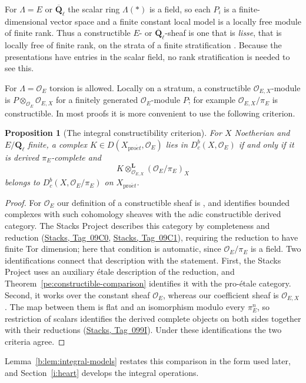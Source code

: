 \documentclass[11pt,a4paper]{article}
\numberwithin{equation}{section}
\newtheorem{proposition}[theorem]{Proposition}
\theoremstyle{definition}
\theoremstyle{remark}
\newcommand{\Dbc}{D^b_c}
\newcommand{\Qbar}{\overline{\mathbf Q}_\ell}
\newcommand{\Ql}{\mathbf Q_\ell}
\newcommand{\proet}{\mathrm{pro}\acute{e}t}
\newcommand{\stacks}[1]{\href{https://stacks.math.columbia.edu/tag/#1}{\textnormal{Stacks, Tag~#1}}}
\begin{document}
For $\Lambda=E$ or $\Qbar$ the scalar ring $\Lambda(*)$ is a field, so
each $P_i$ is a finite-dimensional vector space and a finite constant
local model is a locally free module of finite rank. Thus a constructible
$E$- or $\Qbar$-sheaf is one that is \emph{lisse}, that is locally free
of finite rank, on the strata of a finite stratification
\cite[Definition~6.8.6]{BS}. Because the presentations have
entries in the scalar field, no rank stratification is needed to see
this.

For $\Lambda=\mathcal O_E$ torsion is allowed. Locally on a stratum, a
constructible $\mathcal O_{E,X}$-module is
$P\otimes_{\mathcal O_E}\mathcal O_{E,X}$ for a finitely generated
$\mathcal O_E$-module $P$; for example $\mathcal O_{E,X}/\pi_E$ is
constructible. In most proofs it is more convenient to use the
following criterion.

\begin{proposition}[The integral constructibility criterion]
\label{n:integral-criterion}
For $X$ Noetherian and $E/\Ql$ finite, a complex
$K\in D(X_{\proet},\mathcal O_E)$ lies in $\Dbc(X,\mathcal O_E)$ if and
only if it is derived $\pi_E$-complete and
\[
 K\otimes^{\mathbf L}_{\mathcal O_{E,X}}
             (\mathcal O_E/\pi_E)_X
\]
belongs to $\Dbc(X,\mathcal O_E/\pi_E)$ on $X_{\proet}$.
\end{proposition}
\begin{proof}
For $\mathcal O_E$ our definition of a constructible sheaf is
\cite[Definition~6.8.10]{BS}, and \cite[Proposition~6.8.11(3)]{BS}
identifies bounded complexes with such cohomology sheaves with the adic
constructible derived category. The Stacks Project describes this
category by completeness and reduction (\stacks{09C0}, \stacks{09C1}),
requiring the reduction to have finite Tor dimension; here that
condition is automatic, since $\mathcal O_E/\pi_E$ is a field. Two
identifications connect that description with the statement. First,
the Stacks Project uses an auxiliary \'etale description of the
reduction, and Theorem~\ref{pe:constructible-comparison} identifies it
with the pro-\'etale category. Second, it works over the constant sheaf
$\mathcal O_E$, whereas our coefficient sheaf is $\mathcal O_{E,X}$. The map between
them is flat and an isomorphism modulo every $\pi_E^n$, so restriction
of scalars identifies the derived complete objects on both sides
together with their reductions (\stacks{099I}). Under these
identifications the two criteria agree.
\end{proof}

Lemma~\ref{b:lem:integral-models} restates this comparison in the form
used later, and Section~\ref{i:heart} develops the integral
operations.
\end{document}
